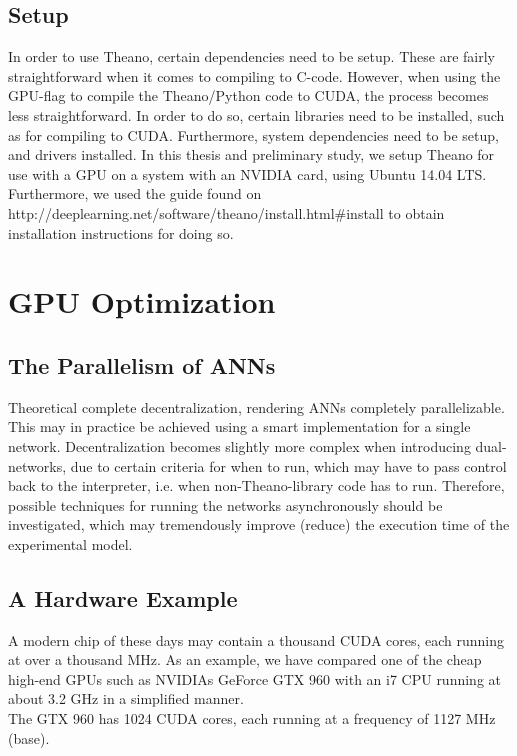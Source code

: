 \subsection{Setup}

In order to use Theano, certain dependencies need to be setup. These are fairly straightforward when it comes to compiling to C-code. However, when using the GPU-flag to compile the Theano/Python code to CUDA, the process becomes less straightforward. In order to do so, certain libraries need to be installed, such as for compiling to CUDA. Furthermore, system dependencies need to be setup, and drivers installed. In this thesis and preliminary study, we setup Theano for use with a GPU on a system with an NVIDIA card, using Ubuntu 14.04 LTS. Furthermore, we used the guide found on \\http://deeplearning.net/software/theano/install.html\#install to obtain installation instructions for doing so.

\section{GPU Optimization}

\subsection{The Parallelism of ANNs}

Theoretical complete decentralization, rendering ANNs completely parallelizable. This may in practice be achieved using a smart implementation for a single network. Decentralization becomes slightly more complex when introducing dual-networks, due to certain criteria for when to run, which may have to pass control back to the interpreter, i.e. when non-Theano-library code has to run. Therefore, possible techniques for running the networks asynchronously should be investigated, which may tremendously improve (reduce) the execution time of the experimental model.

\subsection{A Hardware Example}
A modern chip of these days may contain a thousand CUDA cores, each running at over a thousand MHz. As an example, we have compared one of the cheap high-end GPUs such as NVIDIAs GeForce GTX 960 with an i7 CPU running at about 3.2 GHz in a simplified manner.
\\
The GTX 960 has 1024 CUDA cores, each running at a frequency of 1127 MHz (base).

